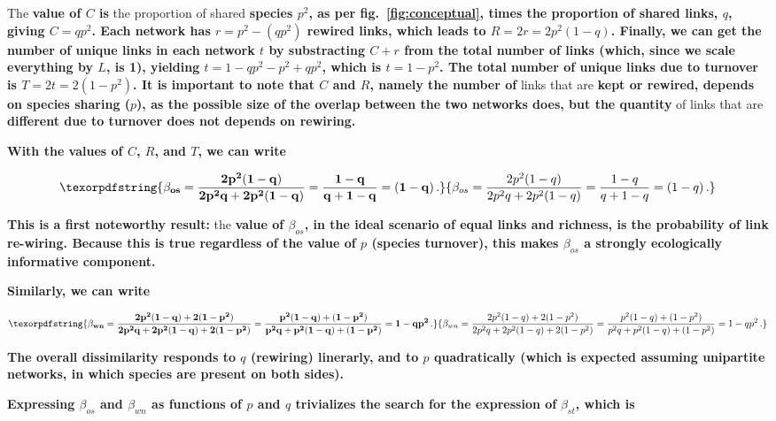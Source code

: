 \documentclass[11pt]{article}
\makeatletter
\def\maxwidth{\ifdim\Gin@nat@width>\linewidth\linewidth
\else\Gin@nat@width\fi}
\let\Oldincludegraphics\includegraphics
\renewcommand{\includegraphics}[1]{\Oldincludegraphics[width=\maxwidth]{#1}}
\providecommand{\DIFaddtex}[1]{{\bf #1}} %
\providecommand{\DIFdeltex}[1]{} %
\providecommand{\DIFaddbegin}{\protect\color{blue}} %
\providecommand{\DIFaddend}{\protect\color{black}} %
\providecommand{\DIFdelbegin}{\protect\color{red}} %
\providecommand{\DIFdelend}{\protect\color{black}} %
\providecommand{\DIFadd}[1]{\texorpdfstring{\DIFaddtex{#1}}{#1}} %
\providecommand{\DIFdel}[1]{\texorpdfstring{\DIFdeltex{#1}}{}} %
\newcommand{\DIFscaledelfig}{0.5}
\newlength{\DIFdelgraphicswidth} %
\newlength{\DIFdelgraphicsheight} %
\newcommand{\DIFaddincludegraphics}[2][]{{\color{blue}\fbox{\DIFOincludegraphics[#1]{#2}}}} %
\newcommand{\DIFdelincludegraphics}[2][]{%
\sbox{\DIFdelgraphicsbox}{\DIFOincludegraphics[#1]{#2}}%
\settoboxwidth{\DIFdelgraphicswidth}{\DIFdelgraphicsbox} %
\settoboxtotalheight{\DIFdelgraphicsheight}{\DIFdelgraphicsbox} %
\scalebox{\DIFscaledelfig}{%
\parbox[b]{\DIFdelgraphicswidth}{\usebox{\DIFdelgraphicsbox}\\[-\baselineskip] \rule{\DIFdelgraphicswidth}{0em}}\llap{\resizebox{\DIFdelgraphicswidth}{\DIFdelgraphicsheight}{%
\setlength{\unitlength}{\DIFdelgraphicswidth}%
\begin{picture}(1,1)%
\thicklines\linethickness{2pt} %
{\color[rgb]{1,0,0}\put(0,0){\framebox(1,1){}}}%
{\color[rgb]{1,0,0}\put(0,0){\line( 1,1){1}}}%
{\color[rgb]{1,0,0}\put(0,1){\line(1,-1){1}}}%
\end{picture}%
}\hspace*{3pt}}} %
} %
\DeclareRobustCommand{\DIFaddbegin}{\DIFOaddbegin \let\includegraphics\DIFaddincludegraphics} %
\DeclareRobustCommand{\DIFaddend}{\DIFOaddend \let\includegraphics\DIFOincludegraphics} %
\DeclareRobustCommand{\DIFdelbegin}{\DIFOdelbegin \let\includegraphics\DIFdelincludegraphics} %
\DeclareRobustCommand{\DIFdelend}{\DIFOaddend \let\includegraphics\DIFOincludegraphics} %
\makeatother
\begin{document}
The \DIFdelbegin \DIFdel{rewiring component \(\beta_{os}\) varies as a function of }\DIFdelend \DIFaddbegin \DIFadd{value of \(C\) is }\DIFaddend the proportion of shared \DIFaddbegin \DIFadd{species \(p^2\), as per
fig.~\ref{fig:conceptual}, times the proportion of shared links, \(q\),
giving \(C = qp^2\). Each network has \(r = p^2-(qp^2)\) rewired links,
which leads to \(R = 2r = 2p^2(1-q)\). Finally, we can get the number of
unique links in each network \(t\) by substracting \(C+r\) from the
total number of links (which, since we scale everything by \(L\), is 1),
yielding \(t = 1 - qp^2 - p^2 + qp^2\), which is \(t = 1-p^2\). The
total number of unique links due to turnover is \(T = 2t = 2(1-p^2)\).
It is important to note that \(C\) and \(R\), namely the number of }\DIFaddend links
that are \DIFdelbegin \DIFdel{rewired; by contrast, \(\beta_{wn}\)
varies \emph{only} as a function of the proportion }\DIFdelend \DIFaddbegin \DIFadd{kept or rewired, depends on species sharing (\(p\)), as the
possible size of the overlap between the two networks does, but the
quantity }\DIFaddend of links that are \DIFdelbegin \DIFdel{shared: that the unshared links are established between common or unique
species has no effect on overall network dissimilarity . The quadratic
nature of }\DIFdelend \DIFaddbegin \DIFadd{different due to turnover does not depends on
rewiring.
}

\DIFadd{With the values of \(C\), \(R\), and \(T\), we can write
}

\[\DIFadd{\beta_{os} = \frac{2p^2(1-q)}{2p^2q+2p^2(1-q)} = \frac{1-q}{q + 1 -q} =
(1-q)\,.}\]

\DIFadd{This is a first noteworthy result: }\DIFaddend the \DIFdelbegin \DIFdel{denominator for }\DIFdelend \DIFaddbegin \DIFadd{value of \(\beta_{os}\), in the
ideal scenario of equal links and richness, is the probability of link
re-wiring. Because this is true regardless of the value of \(p\)
(species turnover), this makes \(\beta_{os}\) a strongly ecologically
informative component.
}

\DIFadd{Similarly, we can write
}

\[\DIFadd{\beta_{wn} = \frac{2p^2(1-q)+2(1-p^2)}{2p^2q + 2p^2(1-q)+2(1-p^2)} = \frac{p^2(1-q)+(1-p^2)}{p^2q+p^2(1-q)+(1-p^2)} = 1-qp^2\,.}\]

\DIFadd{The overall dissimilarity responds to \(q\) (rewiring) linerarly, and to
\(p\) quadratically (which is expected assuming unipartite networks, in
which species are present on both sides).
}

\DIFadd{Expressing \(\beta_{os}\) and \(\beta_{wn}\) as functions of \(p\) and
\(q\) trivializes the search for the expression of }\DIFaddend \(\beta_{st}\)\DIFdelbegin \DIFdel{is clear here, with a
maximum reach when there is no re-wiring,
and a small number of shared
links (\emph{i.e.} the networks are almost entirely dissimilar except
for the }\DIFdelend \DIFaddbegin \DIFadd{, which
is
}
\end{document}
